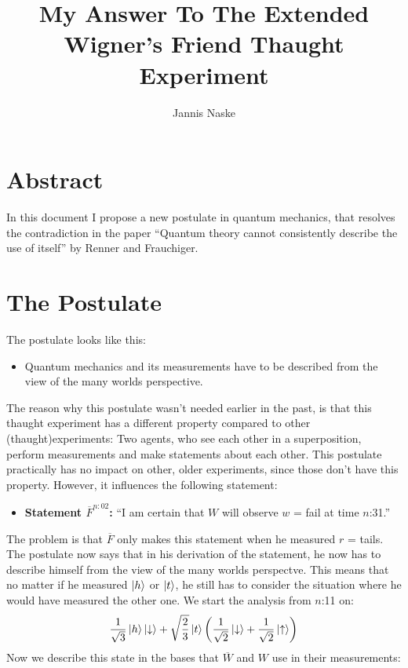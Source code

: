 \documentclass[a4paper]{article}
\title{My Answer To The Extended Wigner's Friend Thaught Experiment}
\author{Jannis Naske}
\begin{document}
\maketitle
\afterpage{\cfoot{\thepage}}

\section*{Abstract}
In this document I propose a new postulate in quantum mechanics, that resolves the contradiction in the paper ``Quantum theory cannot consistently describe the use of itself'' by Renner and Frauchiger.

\section*{The Postulate}
The postulate looks like this:
\begin{itemize}
	\item[] Quantum mechanics and its measurements have to be described from the view of the many worlds perspective.
\end{itemize}
The reason why this postulate wasn't needed earlier in the past, is that this thaught experiment has a different property compared to other (thaught)experiments:
Two agents, who see each other in a superposition, perform measurements and make statements about each other.
This postulate practically has no impact on other, older experiments, since those don't have this property.
However, it influences the following statement:
\begin{itemize}
	\item[] \textbf{Statement $\overline{F}^{n:02}$:} ``I am certain that $W$ will observe $w$ = fail at time $n$:31.''
\end{itemize}
The problem is that $\overline{F}$ only makes this statement when he measured $r$ = tails. The postulate now says that in his derivation of the statement,
he now has to describe himself from the view of the many worlds perspectve. This means that no matter if he measured $\ket{h}$ or $\ket{t}$,
he still has to consider the situation where he would have measured the other one. We start the analysis from $n$:11 on:
\begin{align*}
\frac{1}{\sqrt{3}}\ket{h}\ket{\downarrow} + \sqrt{\frac{2}{3}}\ket{t}\qty(\frac{1}{\sqrt{2}} \ket{\downarrow} + \frac{1}{\sqrt{2}} \ket{\uparrow})
\end{align*}
Now we describe this state in the bases that $\overline{W}$ and $W$ use in their measurements:
\end{document}
